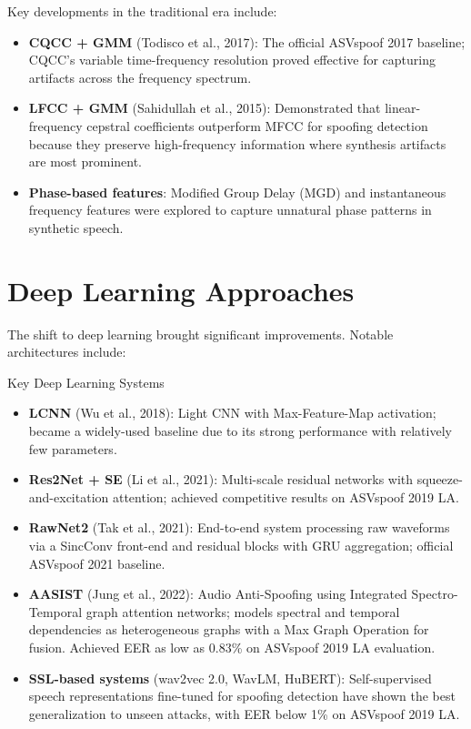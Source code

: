 \documentclass[12pt]{report}
\begin{document}
Key developments in the traditional era include:
\begin{itemize}[noitemsep]
    \item \textbf{CQCC + GMM} (Todisco et al., 2017): The official ASVspoof 2017 baseline;
          CQCC's variable time-frequency resolution proved effective for capturing artifacts
          across the frequency spectrum.
    \item \textbf{LFCC + GMM} (Sahidullah et al., 2015): Demonstrated that linear-frequency
          cepstral coefficients outperform MFCC for spoofing detection because they preserve
          high-frequency information where synthesis artifacts are most prominent.
    \item \textbf{Phase-based features}: Modified Group Delay (MGD) and instantaneous frequency
          features were explored to capture unnatural phase patterns in synthetic speech.
\end{itemize}

\section{Deep Learning Approaches}

The shift to deep learning brought significant improvements. Notable architectures include:

\begin{genbox}{Key Deep Learning Systems}
\begin{itemize}[noitemsep]
    \item \textbf{LCNN} (Wu et al., 2018): Light CNN with Max-Feature-Map activation; became
          a widely-used baseline due to its strong performance with relatively few parameters.
    \item \textbf{Res2Net + SE} (Li et al., 2021): Multi-scale residual networks with
          squeeze-and-excitation attention; achieved competitive results on ASVspoof 2019 LA.
    \item \textbf{RawNet2} (Tak et al., 2021): End-to-end system processing raw waveforms via
          a SincConv front-end and residual blocks with GRU aggregation; official ASVspoof 2021
          baseline.
    \item \textbf{AASIST} (Jung et al., 2022): Audio Anti-Spoofing using Integrated Spectro-Temporal
          graph attention networks; models spectral and temporal dependencies as heterogeneous
          graphs with a Max Graph Operation for fusion. Achieved EER as low as 0.83\% on
          ASVspoof 2019 LA evaluation.
    \item \textbf{SSL-based systems} (wav2vec 2.0, WavLM, HuBERT): Self-supervised speech
          representations fine-tuned for spoofing detection have shown the best generalization
          to unseen attacks, with EER below 1\% on ASVspoof 2019 LA.
\end{itemize}
\end{genbox}
\end{document}
